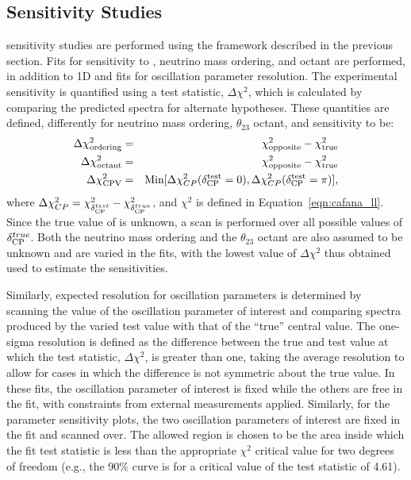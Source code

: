 \subsection{Sensitivity Studies}
\label{sect:methods-dunefits}
 sensitivity studies are performed using the  framework described in the previous section. Fits for sensitivity to , neutrino mass ordering, and octant are performed, in addition to 1D and \twod %
fits for oscillation parameter resolution.
The experimental sensitivity is quantified using a test statistic, $\Delta\chi^2$, which is calculated by comparing the predicted spectra for alternate hypotheses. These quantities are defined, differently for neutrino mass ordering, $\theta_{23}$ octant, and  sensitivity to be:
\begin{eqnarray}
\Delta\chi^2_{\textrm{ordering}} & = & \chi^2_{\textrm{opposite}} - \chi^2_{\textrm{true}} \label{eq:dx2_MH}\\
\Delta\chi^2_{\textrm{octant}} & = & \chi^2_{\textrm{opposite}} - \chi^2_{\textrm{true}} \\
\Delta\chi^2_{\textrm{CPV}} & = & \textrm{Min}[\Delta\chi^2_{CP}(\delta_{\rm CP}^{\textrm{test}}=0),\Delta\chi^2_{CP}(\delta_{\rm CP}^{\textrm{test}}=\pi)],
\end{eqnarray}
where $\Delta\chi^2_{CP} = \chi^{2}_{\delta_{\rm CP}^{test}} - \chi^2_{\delta_{\rm CP}^{true}}$, and $\chi^2$ is defined in Equation~\ref{eqn:cafana_ll}. Since the true value of \deltacp is unknown, a scan is performed over all possible values of $\delta_{\rm CP}^{true}$. Both the neutrino mass ordering and the $\theta_{23}$ octant are also assumed to be unknown and are varied in the fits, with the lowest value of $\Delta\chi^2$ thus obtained used to estimate the sensitivities. 

Similarly, expected resolution for oscillation parameters is determined by scanning the value of the oscillation parameter of interest and comparing spectra produced by the varied test value with that of the ``true'' central value. The one-sigma resolution is defined as the difference between the true and test value at which the test statistic, $\Delta\chi^2$, is greater than one, taking the average resolution to allow for cases in which the difference is not symmetric about the true value. In these fits, the oscillation parameter of interest is fixed while the others are free in the fit, with constraints from external measurements applied. Similarly, for the \twod parameter sensitivity plots, the two oscillation parameters of interest are fixed in the fit and scanned over. The \twod allowed region is chosen to be the area inside which the fit test statistic is less than the appropriate $\chi^2$ critical value for two degrees of freedom (e.g., the 90\%  curve is for a critical value of the test statistic of 4.61).

